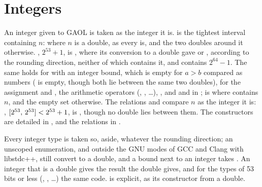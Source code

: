 \section{Integers}\label{sec:integers}
%

An integer given to GAOL is taken as the integer it is.\newinvfive{}
 is the tightest interval containing $n$:  where
$n$ is a double, as every  is, and the two doubles around it
otherwise. , $2^{53}+1$, is
, where its conversion to a double gave
 or , according to the rounding
direction, neither of which contains it, and 
contains $2^{64}-1$. The same holds for  with an integer
bound, which is empty for $a>b$ compared as numbers
( is empty, though both
lie between the same two doubles), for the assignment  and
, the arithmetic operators (, ,
\ldots), , and
 and  in ;
 is  where  contains $n$, and the empty
set otherwise. The relations and  compare $n$
as the integer it is: ,
$[2^{53},\,2^{53}]<2^{53}+1$, is , though no double lies between
them. The constructors are detailed in , and the
relations in .

\medskip
Every integer type is taken so,  aside, whatever the rounding
direction; an unscoped enumeration, and  outside the GNU
modes of GCC and Clang with libstdc++, still convert to a double, and a 
bound next to an integer takes . An integer
that is a double gives the result the double gives, and for the types of 53
bits or less (, , \ldots) the same code.
 is explicit, as its constructor from a double.

